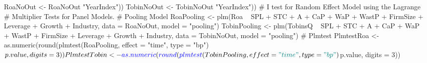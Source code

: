 \documentclass[12pt,]{article}
\newenvironment{Shaded}{}{}
\newcommand{\KeywordTok}[1]{\textcolor[rgb]{0.00,0.00,1.00}{#1}}
\newcommand{\DataTypeTok}[1]{#1}
\newcommand{\DecValTok}[1]{#1}
\newcommand{\StringTok}[1]{\textcolor[rgb]{0.00,0.50,0.50}{#1}}
\newcommand{\CommentTok}[1]{\textcolor[rgb]{0.00,0.50,0.00}{#1}}
\newcommand{\OperatorTok}[1]{#1}
\newcommand{\NormalTok}[1]{#1}
\begin{document}
\begin{Shaded}
\begin{Highlighting}[]
{{\NormalTok{RoaNoOut <-}\StringTok{ }\NormalTok{RoaNoOut }\OperatorTok{%
    \StringTok{"YearIndex"}\NormalTok{))}
\NormalTok{TobinNoOut <-}\StringTok{ }\NormalTok{TobinNoOut }\OperatorTok{%
    \StringTok{"YearIndex"}\NormalTok{))}
\CommentTok{# I test for Random Effect Model using the Lagrange}
\CommentTok{# Multiplier Tests for Panel Models.}
\CommentTok{# Pooling Model}
\NormalTok{RoaPooling <-}\StringTok{ }\KeywordTok{plm}\NormalTok{(Roa }\OperatorTok{~}\StringTok{ }\NormalTok{SPL }\OperatorTok{+}\StringTok{ }\NormalTok{STC }\OperatorTok{+}\StringTok{ }\NormalTok{A }\OperatorTok{+}\StringTok{ }\NormalTok{CaP }\OperatorTok{+}\StringTok{ }\NormalTok{WaP }\OperatorTok{+}\StringTok{ }\NormalTok{WastP }\OperatorTok{+}\StringTok{ }
\StringTok{    }\NormalTok{FirmSize }\OperatorTok{+}\StringTok{ }\NormalTok{Leverage }\OperatorTok{+}\StringTok{ }\NormalTok{Growth }\OperatorTok{+}\StringTok{ }\NormalTok{Industry, }\DataTypeTok{data =}\NormalTok{ RoaNoOut, }
    \DataTypeTok{model =} \StringTok{"pooling"}\NormalTok{)}
\NormalTok{TobinPooling <-}\StringTok{ }\KeywordTok{plm}\NormalTok{(TobinsQ }\OperatorTok{~}\StringTok{ }\NormalTok{SPL }\OperatorTok{+}\StringTok{ }\NormalTok{STC }\OperatorTok{+}\StringTok{ }\NormalTok{A }\OperatorTok{+}\StringTok{ }\NormalTok{CaP }\OperatorTok{+}\StringTok{ }\NormalTok{WaP }\OperatorTok{+}\StringTok{ }
\StringTok{    }\NormalTok{WastP }\OperatorTok{+}\StringTok{ }\NormalTok{FirmSize }\OperatorTok{+}\StringTok{ }\NormalTok{Leverage }\OperatorTok{+}\StringTok{ }\NormalTok{Growth }\OperatorTok{+}\StringTok{ }\NormalTok{Industry, }\DataTypeTok{data =}\NormalTok{ TobinNoOut, }
    \DataTypeTok{model =} \StringTok{"pooling"}\NormalTok{)}
\CommentTok{# Plmtest}
\NormalTok{PlmtestRoa <-}\StringTok{ }\KeywordTok{as.numeric}\NormalTok{(}\KeywordTok{round}\NormalTok{(}\KeywordTok{plmtest}\NormalTok{(RoaPooling, }\DataTypeTok{effect =} \StringTok{"time"}\NormalTok{, }
    \DataTypeTok{type =} \StringTok{"bp"}\NormalTok{)}\OperatorTok{$}\NormalTok{p.value, }\DataTypeTok{digits =} \DecValTok{3}\NormalTok{))}
\NormalTok{PlmtestTobin <-}\StringTok{ }\KeywordTok{as.numeric}\NormalTok{(}\KeywordTok{round}\NormalTok{(}\KeywordTok{plmtest}\NormalTok{(TobinPooling, }\DataTypeTok{effect =} \StringTok{"time"}\NormalTok{, }
    \DataTypeTok{type =} \StringTok{"bp"}\NormalTok{)}\OperatorTok{$}\NormalTok{p.value, }\DataTypeTok{digits =} \DecValTok{3}\NormalTok{))}
}}}}
\end{Highlighting}
\end{Shaded}
\end{document}
